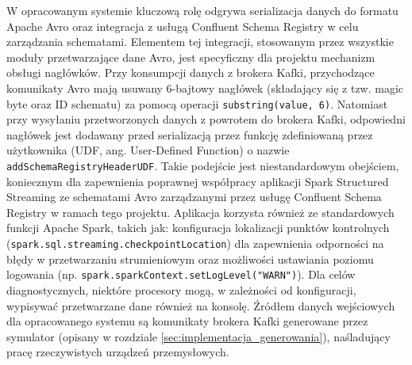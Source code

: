 \begin{enumerate}
W opracowanym systemie kluczową rolę odgrywa serializacja danych do formatu Apache Avro oraz integracja z usługą Confluent Schema Registry w celu zarządzania schematami. Elementem tej integracji, stosowanym przez wszystkie moduły przetwarzające dane Avro, jest specyficzny dla projektu mechanizm obsługi nagłówków. Przy konsumpcji danych z brokera Kafki, przychodzące komunikaty Avro mają usuwany 6-bajtowy nagłówek (składający się z tzw. magic byte oraz ID schematu) za pomocą operacji \texttt{substring(value, 6)}. Natomiast przy wysyłaniu przetworzonych danych z powrotem do brokera Kafki, odpowiedni nagłówek jest dodawany przed serializacją przez funkcję zdefiniowaną przez użytkownika (UDF, ang. User-Defined Function) \cite{spark_udf} o nazwie \texttt{addSchemaRegistryHeaderUDF}. Takie podejście jest niestandardowym obejściem, koniecznym dla zapewnienia poprawnej współpracy aplikacji Spark Structured Streaming ze schematami Avro zarządzanymi przez usługę Confluent Schema Registry \cite{confluent_schema_registry} w ramach tego projektu. Aplikacja korzysta również ze standardowych funkcji Apache Spark, takich jak: konfiguracja lokalizacji punktów kontrolnych (\texttt{spark.sql.streaming.checkpointLocation}) dla zapewnienia odporności na błędy w przetwarzaniu strumieniowym oraz możliwości ustawiania poziomu logowania (np. \texttt{spark.sparkContext.setLogLevel("WARN")}). Dla celów diagnostycznych, niektóre procesory mogą, w zależności od konfiguracji, wypisywać przetwarzane dane również na konsolę. Źródłem danych wejściowych dla opracowanego systemu są komunikaty brokera Kafki generowane przez symulator (opisany w rozdziale \ref{sec:implementacja_generowania}), naśladujący pracę rzeczywistych urządzeń przemysłowych.

\end{enumerate}